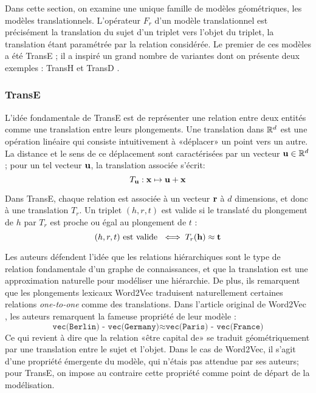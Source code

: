 Dans cette section, on examine une unique famille de modèles géométriques, les modèles translationnels. L'opérateur $F_r$ d'un modèle translationnel est précisément la translation du sujet d'un triplet vers l'objet du triplet, la translation étant paramétrée par la relation considérée. Le premier de ces modèles a été TransE \cite{bordes2013translating}; il a inspiré un grand nombre de variantes dont on présente deux exemples : TransH \cite{transh} et TransD \cite{transd}.

\subsubsection{TransE \cite{bordes2013translating}}

L'idée fondamentale de TransE est de représenter une relation entre deux entités comme une translation entre leurs plongements. Une translation dans $\R^d$ est une opération linéaire qui consiste intuitivement à «déplacer» un point vers un autre. La distance et le sens de ce déplacement sont caractérisées par un vecteur $\bf{u} \in \R^d$; pour un tel vecteur $\bf{u}$, la translation associée s'écrit:
\begin{equation}
    T_\bf{u} : \bf{x} \mapsto \bf{u + x}
\end{equation}

Dans TransE, chaque relation est associée à un vecteur $\bf{r}$ à $d$ dimensions, et donc à une translation $T_r$. Un triplet $(h, r, t)$ est valide si le translaté du plongement de $h$ par $T_r$ est proche ou égal au plongement de $t$ :
\begin{equation}
    (h, r, t) \text{ est valide } \iff T_r(\bf{h}) \approx \bf{t} 
\end{equation}

Les auteurs défendent l'idée que les relations hiérarchiques sont le type de relation fondamentale d'un graphe de connaissances, et que la translation est une approximation naturelle pour modéliser une hiérarchie. %
De plus, ils remarquent que les plongements lexicaux Word2Vec \cite{mikolov2013distributed} traduisent naturellement certaines relations \textit{one-to-one} comme des translations. Dans l'article original de Word2Vec \cite{mikolov2013distributed}, les auteurs remarquent la fameuse propriété de leur modèle :
\begin{equation}
    \texttt{vec(Berlin) - vec(Germany)} \approx 
    \texttt{vec(Paris) - vec(France)}
\end{equation}
Ce qui revient à dire que la relation «être capital de» se traduit géométriquement par une translation entre le sujet et l'objet. Dans le cas de Word2Vec, il s'agit d'une propriété émergente du modèle, qui n'étais pas attendue par ses auteurs; pour TransE, on impose au contraire cette propriété comme point de départ de la modélisation.

